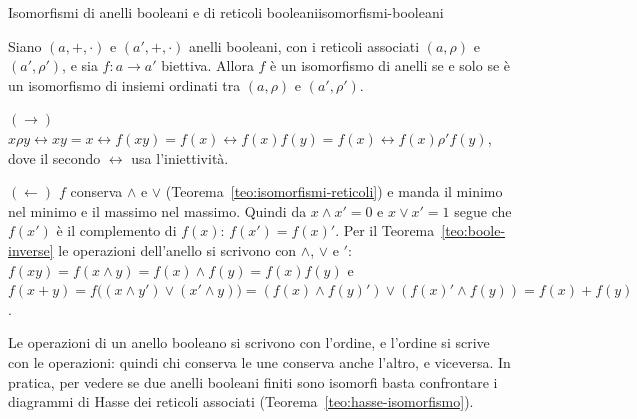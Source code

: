 \begin{concetto}
\begin{Proposizione}{Isomorfismi di anelli booleani e di reticoli booleani}{isomorfismi-booleani}
    \begin{prerequisiti}
    \end{prerequisiti}
    Siano $(a, +, \cdot)$ e $(a', +, \cdot)$ anelli booleani, con i reticoli associati $(a, \rho)$ e $(a', \rho')$, e sia $f \colon a \to a'$ biettiva. Allora $f$ è un isomorfismo di
    anelli se e solo se è un isomorfismo di insiemi ordinati tra $(a, \rho)$ e $(a', \rho')$.
\end{Proposizione}
\begin{dimostrazione}
    \begin{caso}{$(\rightarrow)$}
        $x \rho y \leftrightarrow xy = x \leftrightarrow f(xy) = f(x) \leftrightarrow f(x)f(y) = f(x) \leftrightarrow f(x) \rho' f(y)$, dove il secondo $\leftrightarrow$ usa l'iniettività.
    \end{caso}
    \begin{caso}{$(\leftarrow)$}
        $f$ conserva $\wedge$ e $\vee$ (Teorema~\ref{teo:isomorfismi-reticoli}) e manda il minimo nel minimo e il massimo nel massimo. Quindi da $x \wedge x' = 0$ e $x \vee x' = 1$
        segue che $f(x')$ è il complemento di $f(x)$: $f(x') = f(x)'$. Per il Teorema~\ref{teo:boole-inverse} le operazioni dell'anello si scrivono con $\wedge$, $\vee$ e ${}'$:
        $f(xy) = f(x \wedge y) = f(x) \wedge f(y) = f(x)f(y)$ e $f(x + y) = f\big((x \wedge y') \vee (x' \wedge y)\big) = (f(x) \wedge f(y)') \vee (f(x)' \wedge f(y)) = f(x) + f(y)$.
    \end{caso}
\end{dimostrazione}
\end{concetto}

\begin{spiegazione}
    Le operazioni di un anello booleano si scrivono con l'ordine, e l'ordine si scrive con le operazioni: quindi chi conserva le une conserva
    anche l'altro, e viceversa. In pratica, per vedere se due anelli booleani finiti sono isomorfi basta confrontare i diagrammi di Hasse dei
    reticoli associati (Teorema~\ref{teo:hasse-isomorfismo}).
\end{spiegazione}

